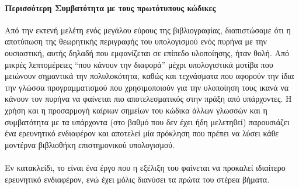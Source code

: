\paragraph*{Περισσότερη Συμβατότητα με τους πρωτότυπους κώδικες}
Από την εκτενή μελέτη ενός μεγάλου εύρους της βιβλιογραφίας, διαπιστώσαμε ότι η αποτύπωση της θεωρητικής περιγραφής του υπολογισμού ενός πυρήνα με την ουσιαστική, αυτής δηλαδή που εμφανίζεται σε επίπεδο υλοποίησης, ήταν θολή.
Από μικρές λεπτομέρειες ``που κάνουν την διαφορά'' μέχρι υπολογιστικά μοτίβα που μειώνουν σημαντικά την πολυλοκότητα, καθώς και τεχνάσματα που αφορούν την ίδια την γλώσσα προγραμματισμού που χρησιμοποιούν για την υλοποίηση τους ικανά να κάνουν τον πυρήνα να φαίνεται πιο αποτελεσματικός στην πράξη από υπάρχοντες.
Η χρήση και η προσαρμογή καίριων σημείων του κώδικα άλλων γλωσσών και η συμβατότητα με τα υπάρχοντα (στο βαθμό που δεν έχει ήδη μελετηθεί) παρουσιάζει ένα ερευνητικό ενδιαφέρον και αποτελεί μία πρόκληση που πρέπει να λύσει κάθε μοντέρνα βιβλιοθήκη επιστημονικού υπολογισμού.\\
\paragraph*{}Εν κατακλείδι, το  είναι ένα έργο που η εξέλιξη του φαίνεται να προκαλεί ιδιαίτερο ερευνητικό ενδιαφέρον, ενώ έχει μόλις διανύσει τα πρώτα του στέρεα βήματα.
